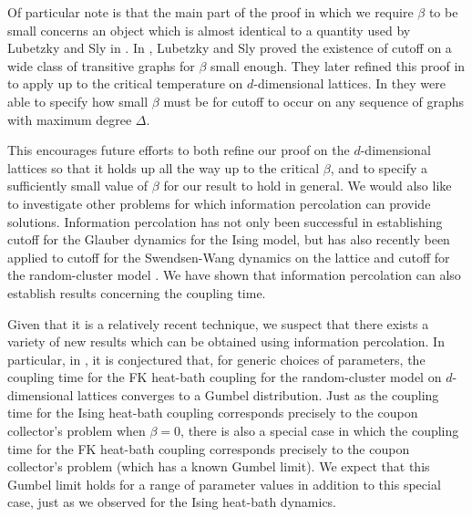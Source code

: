 Of particular note is that the main part of the proof in which we require $\beta$ to be small concerns an object which is almost identical to a quantity used by Lubetzky and Sly in \cite{Lubetzky2015-po}. In \cite{Lubetzky2015-po}, Lubetzky and Sly proved the existence of cutoff on a wide class of transitive graphs for $\beta$ small enough. They later refined this proof in \cite{Lubetzky2016-wd} to apply up to the critical temperature on $d$-dimensional lattices. In \cite{Lubetzky2017-nc} they were able to specify how small $\beta$ must be for cutoff to occur on any sequence of graphs with maximum degree $\Delta$.

This encourages future efforts to both refine our proof on the $d$-dimensional lattices so that it holds up all the way up to the critical $\beta$, and to specify a sufficiently small value of $\beta$ for our result to hold in general.
We would also like to investigate other problems for which information percolation can provide solutions. Information percolation has not only been successful in establishing cutoff for the Glauber dynamics for the Ising model, but has also recently been applied to cutoff for the Swendsen-Wang dynamics on the lattice \cite{Nam2018-io} and cutoff for the random-cluster model \cite{Ganguly2018-lv}. We have shown that information percolation can also establish results concerning the coupling time. 

Given that it is a relatively recent technique, we suspect that there exists a variety of new results which can be obtained using information percolation. In particular, in \cite[Conjecture 2.7]{Collevecchio2018-nq}, it is conjectured that, for generic choices of parameters, the coupling time for the FK heat-bath coupling for the random-cluster model on $d$-dimensional lattices converges to a Gumbel distribution. Just as the coupling time for the Ising heat-bath coupling corresponds precisely to the coupon collector's problem when $\beta = 0$, there is also a special case in which the coupling time for the FK heat-bath coupling corresponds precisely to the coupon collector's problem (which has a known Gumbel limit). We expect that this Gumbel limit holds for a range of parameter values in addition to this special case, just as we observed for the Ising heat-bath dynamics.



